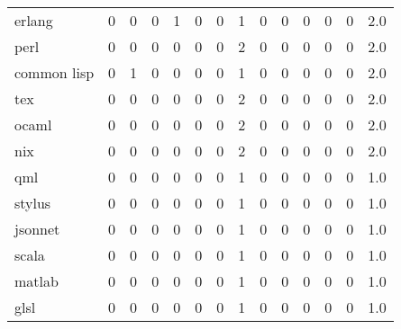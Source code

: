 \begin{tabular}{lrrrrrrrrrrrrr}
erlang           &        0 &       0 &          0 &               1 &                0 &       0 &          1 &         0 &         0 &      0 &             0 &         0 &      2.0 \\
perl             &        0 &       0 &          0 &               0 &                0 &       0 &          2 &         0 &         0 &      0 &             0 &         0 &      2.0 \\
common lisp      &        0 &       1 &          0 &               0 &                0 &       0 &          1 &         0 &         0 &      0 &             0 &         0 &      2.0 \\
tex              &        0 &       0 &          0 &               0 &                0 &       0 &          2 &         0 &         0 &      0 &             0 &         0 &      2.0 \\
ocaml            &        0 &       0 &          0 &               0 &                0 &       0 &          2 &         0 &         0 &      0 &             0 &         0 &      2.0 \\
nix              &        0 &       0 &          0 &               0 &                0 &       0 &          2 &         0 &         0 &      0 &             0 &         0 &      2.0 \\
qml              &        0 &       0 &          0 &               0 &                0 &       0 &          1 &         0 &         0 &      0 &             0 &         0 &      1.0 \\
stylus           &        0 &       0 &          0 &               0 &                0 &       0 &          1 &         0 &         0 &      0 &             0 &         0 &      1.0 \\
jsonnet          &        0 &       0 &          0 &               0 &                0 &       0 &          1 &         0 &         0 &      0 &             0 &         0 &      1.0 \\
scala            &        0 &       0 &          0 &               0 &                0 &       0 &          1 &         0 &         0 &      0 &             0 &         0 &      1.0 \\
matlab           &        0 &       0 &          0 &               0 &                0 &       0 &          1 &         0 &         0 &      0 &             0 &         0 &      1.0 \\
glsl             &        0 &       0 &          0 &               0 &                0 &       0 &          1 &         0 &         0 &      0 &             0 &         0 &      1.0 \\

\end{tabular}
